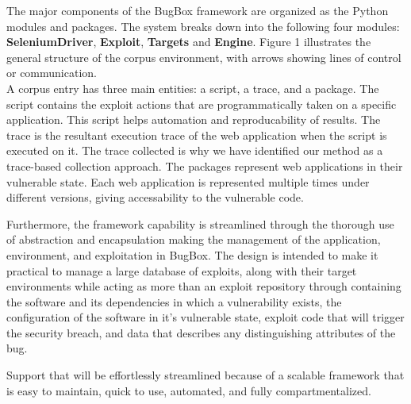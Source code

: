 \documentclass[letterpaper,twocolumn,10pt]{article}
\begin{document}
The major components of the BugBox framework are organized as the Python modules and packages. The system breaks down into the following four modules: {\bf SeleniumDriver}, {\bf Exploit},  {\bf Targets} and {\bf Engine}.  Figure 1 illustrates the general structure of the corpus environment, with arrows showing lines of control or communication. \\  

A corpus entry has three main entities: a script, a trace, and a package.  The script contains the exploit actions that are programmatically taken on a specific application.  This script helps automation and reproducability of results.  The trace is the resultant execution trace of the web application when the script is executed on it.  The trace collected is why we have identified our method as a trace-based collection approach.  The packages represent web applications in their vulnerable state.  Each web application is represented multiple times under different versions, giving accessability to the vulnerable code. 



  Furthermore, the framework capability is streamlined through the thorough use of abstraction and encapsulation making the management of the application, environment, and exploitation in BugBox. 
 The design is intended to make it practical to manage a large database of exploits, along with their target environments while acting as more than an exploit repository through containing the software and its dependencies in which a vulnerability exists, the configuration of the software in it's vulnerable state, exploit code that will trigger the security breach, and data that describes any distinguishing attributes of the bug.

Support that will be effortlessly streamlined because of a scalable framework that is easy to maintain, quick to use, automated, and fully compartmentalized.  
\end{document}
